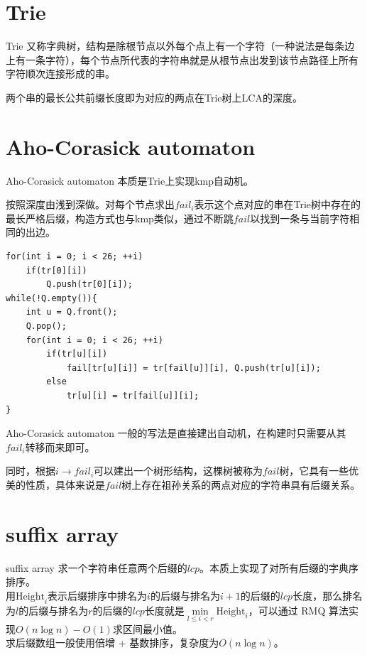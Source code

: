\documentclass{beamer}
\begin{document}
\section{Trie}
\begin{frame}{Trie}
	又称字典树，结构是除根节点以外每个点上有一个字符（一种说法是每条边上有一条字符），每个节点所代表的字符串就是从根节点出发到该节点路径上所有字符顺次连接形成的串。\\
	\pause
	
	两个串的最长公共前缀长度即为对应的两点在Trie树上LCA的深度。
\end{frame}
\section{Aho-Corasick automaton}
\begin{frame}[fragile]{Aho-Corasick automaton}
	本质是Trie上实现kmp自动机。\\
	\pause
	
	按照深度由浅到深做。对每个节点求出$fail_i$表示这个点对应的串在Trie树中存在的最长严格后缀，构造方式也与kmp类似，通过不断跳$fail$以找到一条与当前字符相同的出边。
	\pause
	
\begin{verbatim}
for(int i = 0; i < 26; ++i)
    if(tr[0][i])
        Q.push(tr[0][i]);
while(!Q.empty()){
    int u = Q.front();
    Q.pop();
    for(int i = 0; i < 26; ++i)
        if(tr[u][i])
            fail[tr[u][i]] = tr[fail[u]][i], Q.push(tr[u][i]);
        else
            tr[u][i] = tr[fail[u]][i];
}
\end{verbatim}
\end{frame}
\begin{frame}{Aho-Corasick automaton}
	一般的写法是直接建出自动机，在构建时只需要从其$fail_i$转移而来即可。\\
	\pause
	
	同时，根据$i \to fail_i$可以建出一个树形结构，这棵树被称为$fail$树，它具有一些优美的性质，具体来说是$fail$树上存在祖孙关系的两点对应的字符串具有后缀关系。
\end{frame}

\section{suffix array}
\begin{frame}{suffix array}
	求一个字符串任意两个后缀的$lcp$。本质上实现了对所有后缀的字典序排序。\\
	
	用$\mathrm{Height}_i$表示后缀排序中排名为$i$的后缀与排名为$i+1$的后缀的$lcp$长度，那么排名为$l$的后缀与排名为$r$的后缀的$lcp$长度就是$\min\limits_{l \le i < r}\mathrm{Height}_i$，可以通过 RMQ 算法实现$O(n\log n) - O(1)$求区间最小值。\\
	
	求后缀数组一般使用倍增 + 基数排序，复杂度为$O(n\log n)$。
\end{frame}
\end{document}
